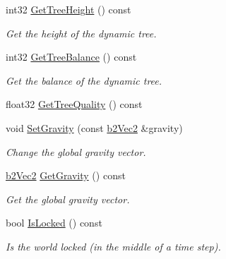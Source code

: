 \begin{DoxyCompactItemize}
\mbox{\label{classb2_world_abc99b2beb6ba79ac6c80f33bac264b52}} 
int32 \hyperlink{classb2_world_abc99b2beb6ba79ac6c80f33bac264b52}{Get\+Tree\+Height} () const
\begin{DoxyCompactList}\small\item\em Get the height of the dynamic tree. \end{DoxyCompactList}\item 
\mbox{\label{classb2_world_aaca027331f06d93d978b44e065873f80}} 
int32 \hyperlink{classb2_world_aaca027331f06d93d978b44e065873f80}{Get\+Tree\+Balance} () const
\begin{DoxyCompactList}\small\item\em Get the balance of the dynamic tree. \end{DoxyCompactList}\item 
float32 \hyperlink{classb2_world_a562935b3b8161dd18a467e02f479e88a}{Get\+Tree\+Quality} () const
\item 
\mbox{\label{classb2_world_aeafa43d6580e1dddb0675e672ca2375c}} 
void \hyperlink{classb2_world_aeafa43d6580e1dddb0675e672ca2375c}{Set\+Gravity} (const \hyperlink{structb2_vec2}{b2\+Vec2} \&gravity)
\begin{DoxyCompactList}\small\item\em Change the global gravity vector. \end{DoxyCompactList}\item 
\mbox{\label{classb2_world_abd41cdde8eaa3d1c58d2f00eaf688ec3}} 
\hyperlink{structb2_vec2}{b2\+Vec2} \hyperlink{classb2_world_abd41cdde8eaa3d1c58d2f00eaf688ec3}{Get\+Gravity} () const
\begin{DoxyCompactList}\small\item\em Get the global gravity vector. \end{DoxyCompactList}\item 
\mbox{\label{classb2_world_a71ca09a3082945a7e77f3f39fb021237}} 
bool \hyperlink{classb2_world_a71ca09a3082945a7e77f3f39fb021237}{Is\+Locked} () const
\begin{DoxyCompactList}\small\item\em Is the world locked (in the middle of a time step). \end{DoxyCompactList}\item 

\end{DoxyCompactItemize}
